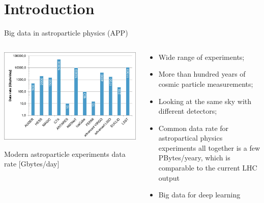
\begin{frame}
\titlepage
\end{frame}

\section{Introduction}

\begin{frame}{Big data in astroparticle physics (APP)}
\small
\vspace{-2em}
\begin{columns}
  \begin{column}[t]{0.55\textwidth}
    \begin{center}
     \vspace{-1em}
      \includegraphics[width=1.12\textwidth]{pics/appec_computing-diagram.pdf}
    \end{center}
    \vspace{-2\parsep}
    \small Modern astroparticle experiments data rate [Gbytes/day]\footnotemark[1] %
  \end{column}
  \hfill
  \begin{column}[t]{0.42\textwidth}
    \begin{itemize}
    \item Wide range of experiments;
    \item More than hundred years of cosmic particle measurements;
    \item Looking at the same sky with different detectors;
    \item Common data rate for astropartical physics experiments all together is a few PBytes/yeary, which is comparable to the current LHC output\footnotemark[1] %
    \item Big data for deep learning
    \end{itemize}


\end{column}
\end{columns}
\end{frame}
